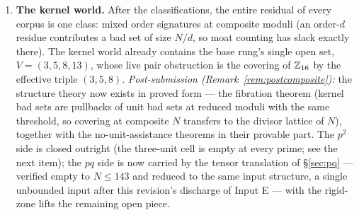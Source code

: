 \begin{enumerate}[leftmargin=1.7em,itemsep=4pt]
\item \textbf{The kernel world.} After the classifications, the entire
  residual of every corpus is one class: mixed order signatures at
  composite moduli (an order-$d$ residue contributes a bad set of size
  $N/d$, so moat counting has slack exactly there). The kernel world
  already contains the base rung's single open set,
  $V=(3,5,8,13)$, whose live pair obstruction is the covering of
  $\mathbb{Z}_{16}$ by the effective triple $(3,5,8)$. \emph{Post-submission
  (Remark~\ref{rem:postcomposite}):} the structure theory now exists in
  proved form --- the fibration theorem (kernel bad sets are pullbacks of
  unit bad sets at reduced moduli with the same threshold, so covering at
  composite $N$ transfers to the divisor lattice of $N$), together with
  the no-unit-assistance theorems in their provable part. The $p^2$ side
  is closed outright (the three-unit cell is empty at every prime; see
  the next item); the $pq$ side is now carried by the tensor translation
  of \S\ref{sec:pq} --- verified empty to $N\le143$ and reduced to the
  same input structure, a single unbounded input after this revision's
  discharge of Input E --- with the rigid-zone lifts the remaining open
  piece.


\end{enumerate}

